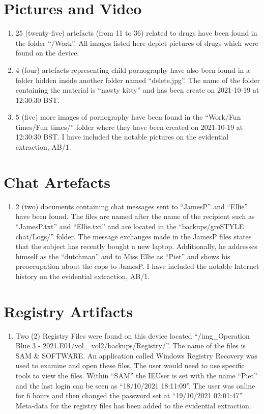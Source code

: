\documentclass[11pt]{article}
\begin{document}
\section*{Pictures and Video}
\begin{enumerate}[resume]
    \item 25 (twenty-five) artefacts (from 11 to 36) related to drugs have been found in the folder “/Work”. All images listed here depict pictures of drugs which were found on the device.
    \item 4 (four) artefacts representing child pornography have also been found in a folder hidden inside another folder named “delete.jpg”. The name of the folder containing the material is “nawty kitty” and has been create on 2021-10-19 at 12:30:30 BST.
    \item 5 (five) more images of pornography have been found in the “Work/Fun times/Fun times/” folder where they have been created on 2021-10-19 at 12:30:30 BST. I have included the notable pictures on the evidential extraction, AB/1.
\end{enumerate}

\section*{Chat Artefacts}
\begin{enumerate}[resume]
    \item 2 (two) documents containing chat messages sent to “JamesP” and “Ellie” have been found. The files are named after the name of the recipient such as “JamesP.txt” and “Ellie.txt” and are located in the “backups/greSTYLE chat/Logs/” folder. The message exchanges made in the JamesP files states that the subject has recently bought a new laptop. Additionally, he addresses himself as the “dutchman” and to Miss Ellie as “Piet” and shows his preoccupation about the cops to JamesP. I have included the notable Internet history on the evidential extraction, AB/1.
\end{enumerate}

\section*{Registry Artifacts}
\begin{enumerate}[resume]
    \item Two (2) Registry Files were found on this device located “/img\_Operation Blue 3 - 2021.E01/vol\_ vol2/backups/Registry/”. The name of the files is SAM \& SOFTWARE. An application called Windows Registry Recovery was used to examine and open these files. The user would need to use specific tools to view the files. Within “SAM” the IEUser is set with the name “Piet” and the last login can be seen as “18/10/2021 18:11:09”. The user was online for 6 hours and then changed the password set at “19/10/2021 02:01:47” Meta-data for the registry files has been added to the evidential extraction.
\end{enumerate}
\end{document}
